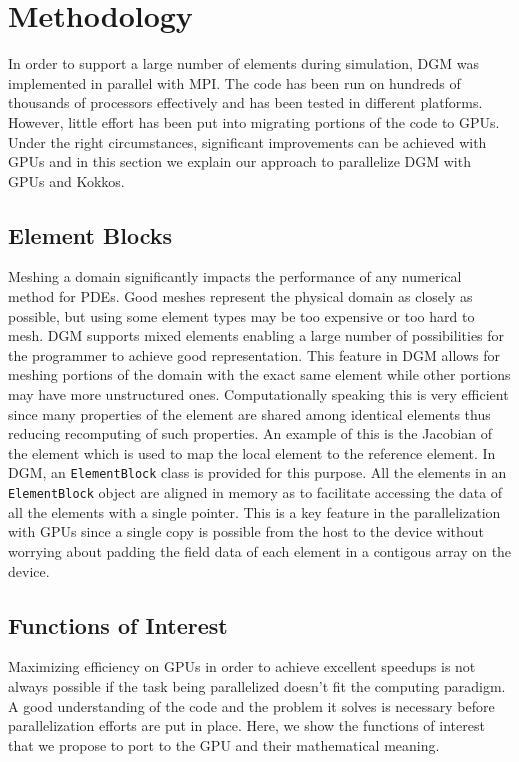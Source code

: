 \documentclass{ccr16}
\begin{document}
{{            
        }
    }

    \section{Methodology}
    {
        \label{PDBM:sec:methodology}

        In order to support a large number of elements during simulation, DGM was implemented in parallel with MPI. The code has been run on hundreds of thousands of processors effectively and has been tested in different platforms. However, little effort has been put into migrating portions of the code to GPUs. Under the right circumstances, significant improvements can be achieved with GPUs and in this section we explain our approach to parallelize DGM with GPUs and Kokkos.

        \subsection{Element Blocks}
        {
            Meshing a domain significantly impacts the performance of any numerical method for PDEs. Good meshes represent the physical domain as closely as possible, but using some element types may be too expensive or too hard to mesh. DGM supports mixed elements enabling a large number of possibilities for the programmer to achieve good representation. This feature in DGM allows for meshing portions of the domain with the exact same element while other portions may have more unstructured ones. Computationally speaking this is very efficient since many properties of the element are shared among identical elements thus reducing recomputing of such properties. An example of this is the Jacobian of the element which is used to map the local element to the reference element. In DGM, an \texttt{ElementBlock} class is provided for this purpose. All the elements in an \texttt{ElementBlock} object are aligned in memory as to facilitate accessing the data of all the elements with a single pointer. This is a key feature in the parallelization with GPUs since a single copy is possible from the host to the device without worrying about padding the field data of each element in a contigous array on the device.
        }

        \subsection{Functions of Interest}
        {
            Maximizing efficiency on GPUs in order to achieve excellent speedups is not always possible if the task being parallelized doesn't fit the computing paradigm. A good understanding of the code and the problem it solves is necessary before parallelization efforts are put in place. Here, we show the functions of interest that we propose to port to the GPU and their mathematical meaning.

}}
\end{document}
